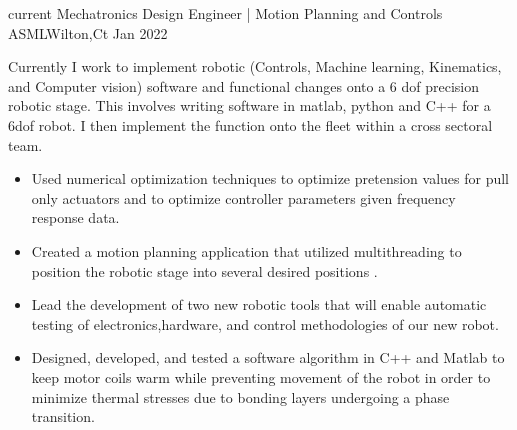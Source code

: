 \begin{experiences}

\experience
  {current}      {Mechatronics Design Engineer |  Motion Planning and Controls }{ASML}{Wilton,Ct}
  {Jan 2022} {
                  Currently I work to implement robotic (Controls, Machine learning, Kinematics, and Computer vision) software and functional changes onto a 6 dof precision robotic stage. This involves writing software in matlab, python and C++ for a 6dof robot. I then implement the function onto the fleet within a cross sectoral team. 
			\begin{itemize}
		\item Used numerical optimization techniques to optimize pretension  values for pull only actuators and to optimize controller parameters given frequency response data.
                       \item Created a motion planning application that utilized multithreading to position the robotic stage into several desired positions .
		    \item Lead the development of two new robotic tools that will enable automatic testing of electronics,hardware, and control methodologies of our new robot.
		 \item Designed, developed, and tested a software algorithm in C++ and Matlab to keep motor coils warm while preventing movement of the robot in order to minimize thermal stresses due to bonding layers undergoing a phase transition.
		

\end{itemize}}
\end{experiences}
